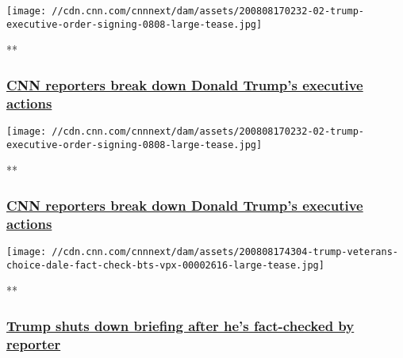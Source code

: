 \href{/videos/politics/2020/08/08/trump-signs-executive-actions-unemployment-stimulus-holmes-dale-nr-vpx.cnn}{}

\texttt{[image: //cdn.cnn.com/cnnnext/dam/assets/200808170232-02-trump-executive-order-signing-0808-large-tease.jpg]}

**

\hypertarget{cnn-reporters-break-down-donald-trumps-executive-actions}{%
\subsubsection{\texorpdfstring{\href{/videos/politics/2020/08/08/trump-signs-executive-actions-unemployment-stimulus-holmes-dale-nr-vpx.cnn}{CNN
reporters break down Donald Trump's executive
actions}}{CNN reporters break down Donald Trump's executive actions}}\label{cnn-reporters-break-down-donald-trumps-executive-actions}}

\href{/videos/politics/2020/08/08/trump-signs-executive-orders-unemployment-stimulus-holmes-dale-nr-vpx.cnn}{}

\texttt{[image: //cdn.cnn.com/cnnnext/dam/assets/200808170232-02-trump-executive-order-signing-0808-large-tease.jpg]}

**

\hypertarget{cnn-reporters-break-down-donald-trumps-executive-actions-1}{%
\subsubsection{\texorpdfstring{\href{/videos/politics/2020/08/08/trump-signs-executive-orders-unemployment-stimulus-holmes-dale-nr-vpx.cnn}{CNN
reporters break down Donald Trump's executive
actions}}{CNN reporters break down Donald Trump's executive actions}}\label{cnn-reporters-break-down-donald-trumps-executive-actions-1}}

\href{/videos/politics/2020/08/08/trump-veterans-choice-dale-fact-check-bts-vpx.cnn}{}

\texttt{[image: //cdn.cnn.com/cnnnext/dam/assets/200808174304-trump-veterans-choice-dale-fact-check-bts-vpx-00002616-large-tease.jpg]}

**

\hypertarget{trump-shuts-down-briefing-after-hes-fact-checked-by-reporter}{%
\subsubsection{\texorpdfstring{\href{/videos/politics/2020/08/08/trump-veterans-choice-dale-fact-check-bts-vpx.cnn}{Trump
shuts down briefing after he's fact-checked by
reporter}}{Trump shuts down briefing after he's fact-checked by reporter}}\label{trump-shuts-down-briefing-after-hes-fact-checked-by-reporter}}

